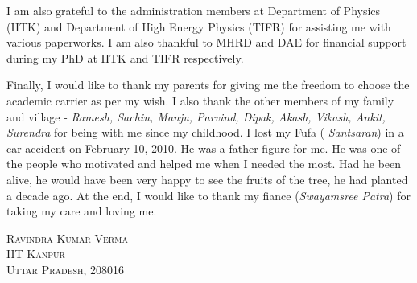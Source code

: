 I am also grateful to the administration members at Department of Physics 
(IITK) and Department of High Energy Physics (TIFR) for assisting me 
with various paperworks. I am also thankful to MHRD and DAE for financial 
support during my PhD at IITK and TIFR respectively.

Finally, I would like to thank my parents for giving me the freedom to choose the 
academic carrier as per my wish. I also thank the other members of my family and 
village - \textit{Ramesh, Sachin, Manju, Parvind, Dipak, Akash, Vikash, 
Ankit, Surendra} for being with me since my childhood. I lost my Fufa (
\textit{Santsaran}) in a car accident on February 10, 2010. He was a father-figure for me. He was one of the people who motivated and helped me when I needed the most. Had he been alive, he would have been very happy to see the fruits of the tree, he had planted a decade ago. At the end, I would like to thank my fiance (\textit {Swayamsree Patra}) for taking my care and loving me.

\vspace{20pt}
\begin{flushright}
	\textsc{Ravindra Kumar Verma}\\\textsc{IIT Kanpur}\\
	\textsc{Uttar Pradesh}, 208016
\end{flushright}
